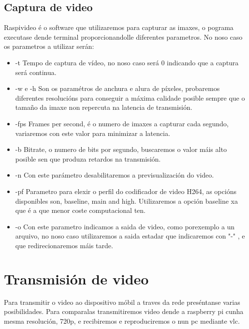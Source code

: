 \subsection{Captura de video}
Raspivideo é o software que utilizaremos para capturar as imaxes, o pograma executase dende terminal proporcionandolle diferentes parametros. No noso caso os parametros a utilizar serán:
\begin{itemize}
    \item -t Tempo de captura de vídeo, no noso caso será 0 indicando que a captura será continua.
    \item -w e -h Son os paramétros de anchura e alura de píxeles, probaremos diferentes resolucións para conseguir a máxima calidade posible sempre que o tamaño da imaxe non repercuta na latencia de transmisión.
    \item -fps Frames per second, é o numero de imaxes a capturar cada segundo, variaremos con este valor para minimizar a latencia.
    \item -b Bitrate, o numero de bits por segundo, buscaremos o valor máis alto posible sen que produza retardos na transmisión.
    \item -n Con este parámetro desabilitaremos a previsualización do video.
    \item -pf Parametro para elexir o perfil do codificador de video H264, as opcións disponibles son, baseline, main and high. Utilizaremos a opción baseline xa que é a que menor coste computacional ten.
    \item -o Con este parametro indicamos a saida de video, como porexemplo a un arquivo, no noso caso utilizaremos a saida estadar que indicaremos con "-" , e que redirecionaremos máis tarde.
\end{itemize}

\section{Transmisión de video}
Para transmitir o video ao dispositivo móbil a traves da rede preséntanse varias posibilidades. Para comparalas transmitiremos video dende a raspberry pi cunha mesma resolución, 720p, e recibiremos e reproduciremos o nun pc mediante vlc.

